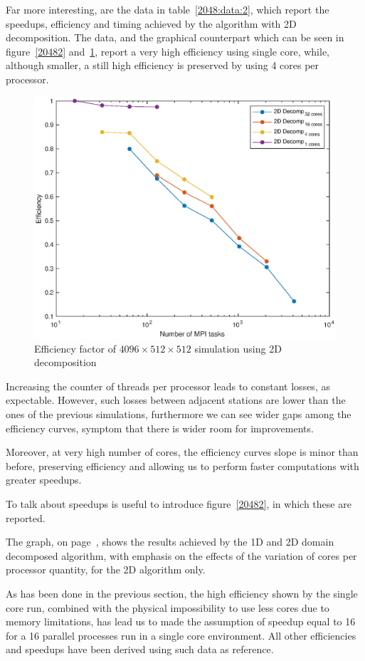Far more interesting, are the data in table~\ref{2048:data:2}, which report the speedups, efficiency and timing achieved by the algorithm with 2D decomposition. The data, and the graphical counterpart which can be seen in figure~\ref{20482} and~\ref{20484}, report a very high efficiency using single core, while, although smaller, a still high efficiency is preserved by using 4 cores per processor.\\
\par
\begin{figure}
\begin{center}
\includegraphics[scale=0.55]{grafici/20484}
\caption{Efficiency factor of $4096\times512 \times512$ simulation using 2D decomposition}
\label{20484}
\end{center}
\end{figure}
Increasing the counter of threads per processor leads to constant losses, as expectable. However, such losses between adjacent stations are lower than the ones of the previous simulations, furthermore we can see wider gaps among the efficiency curves, symptom that there is wider room for improvements.\par
Moreover, at very high number of cores, the efficiency curves slope is minor than before, preserving efficiency and allowing us to perform faster computations with greater speedups.\\
\par
To talk about speedups is useful to introduce figure~\ref{20482}, in which these are reported.\par
The graph, on page~\pageref{20482}, shows the results achieved by the 1D and 2D domain decomposed algorithm, with emphasis on the effects of the variation of cores per processor quantity, for the 2D algorithm only.\par
As has been done in the previous section, the high efficiency shown by the single core run, combined with the physical impossibility to use less cores due to memory limitations, has lead us to made the assumption of speedup equal to 16 for a 16 parallel processes run in a single core environment. All other efficiencies and speedups have been derived using such data as reference.\\
\par

